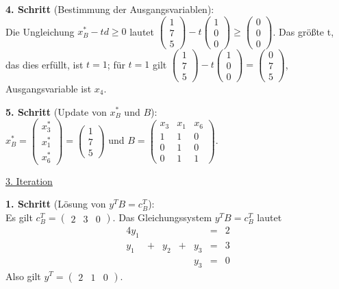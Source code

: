 \documentclass[10pt,a4paper,oneside,ngerman,numbers=noenddot]{scrartcl}
\begin{document}
		\textbf{4. Schritt} (Bestimmung der Ausgangsvariablen):\\
		Die Ungleichung $x_{B}^{*} - td \geq 0$ lautet $\begin{pmatrix} 1 \\ 7 \\ 5\end{pmatrix} - t \begin{pmatrix}1 \\ 0 \\ 0 \end{pmatrix} \geq \begin{pmatrix} 0 \\ 0 \\ 0 \end{pmatrix}$. Das größte t, das dies erfüllt, ist $t = 1$; für $t = 1$ gilt $\begin{pmatrix} 1 \\ 7 \\ 5\end{pmatrix} - t \begin{pmatrix}1 \\ 0 \\ 0 \end{pmatrix} = \begin{pmatrix} 0 \\ 7 \\ 5 \end{pmatrix}$, Ausgangsvariable ist $x_{4}$.
		
		\textbf{5. Schritt} (Update von $x_{B}^{*}$ und $B$):\\
		$x_{B}^{*} = \begin{pmatrix} x_{3}^{*} \\ x_{1}^{*} \\ x_{6}^{*} \end{pmatrix} = \begin{pmatrix} 1 \\ 7 \\ 5 \end{pmatrix}$ und $B = \begin{pmatrix} x_{3} & x_{1} & x_{6} \\ 1 & 1 & 0 \\ 0 & 1 & 0 \\ 0 & 1 & 1 \end{pmatrix}$.
		
		\underline{3. Iteration}
		
		\textbf{1. Schritt} (Lösung von $y^{T}B = c_{B}^{T}$):\\
		Es gilt $c_{B}^{T} = \begin{pmatrix} 2 & 3 & 0 \end{pmatrix}$. Das Gleichungssystem $y^{T}B = c_{B}^{T}$ lautet
		\begin{alignat*}{4}
			y_{1} && && &=& 2 \\
			y_{1} &+& y_{2} &+& y_{3} &=& 3 \\
			&& && y_{3} &=& 0
		\end{alignat*}
		Also gilt $y^{T} = \begin{pmatrix} 2 & 1 & 0 \end{pmatrix}$.
		
\end{document}
